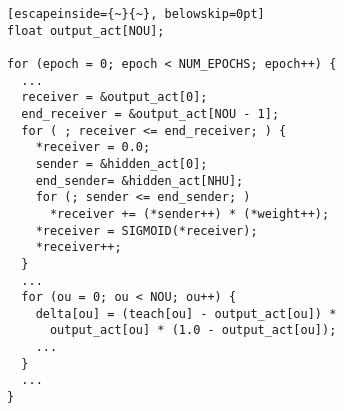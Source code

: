 \begin{lstlisting}[escapeinside={~}{~}, belowskip=0pt]
float output_act[NOU];

for (epoch = 0; epoch < NUM_EPOCHS; epoch++) {
  ...
  receiver = &output_act[0];
  end_receiver = &output_act[NOU - 1];
  for ( ; receiver <= end_receiver; ) {
    *receiver = 0.0;
    sender = &hidden_act[0];
    end_sender= &hidden_act[NHU];
    for (; sender <= end_sender; )
      *receiver += (*sender++) * (*weight++);
    *receiver = SIGMOID(*receiver);
    *receiver++;
  }
  ...
  for (ou = 0; ou < NOU; ou++) {
  	delta[ou] = (teach[ou] - output_act[ou]) *
      output_act[ou] * (1.0 - output_act[ou]);
  	...
  }
  ...
}
\end{lstlisting}
